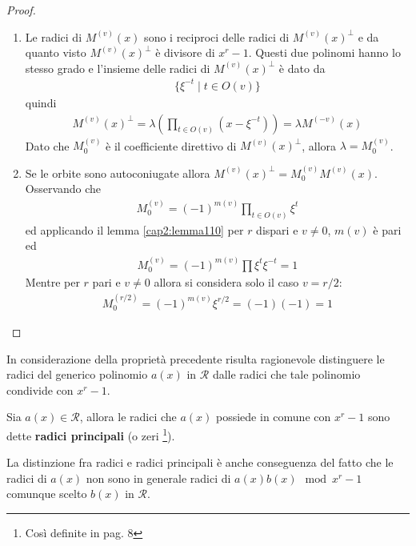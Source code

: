 \begin{proof}
\begin{enumerate}
      \item Le radici di $M^{(v)}(x)$ sono i reciproci delle radici di $M^{(v)}(x)^{\perp}$ e da quanto visto $M^{(v)}(x)^{\perp}$ è divisore di $x^r - 1$. Questi due polinomi hanno lo stesso grado e l'insieme delle radici di $M^{(v)}(x)^{\perp}$ è dato da
      \begin{align*}
	 \lbrace \xi^{-t} \mid t \in O(v) \rbrace
       \end{align*}
      quindi
      \begin{align*}
	 M^{(v)}(x)^{\perp} = \lambda (\prod_{t \in O(v)}(x-\xi^{-t}) ) = \lambda M^{(-v)}(x)
       \end{align*}
      Dato che $M_{0}^{(v)}$ è il coefficiente direttivo di $M^{(v)}(x)^{\perp}$, allora $\lambda = M_{0}^{(v)}$.
      \item Se le orbite sono autoconiugate allora $M^{(v)}(x)^{\perp} = M_{0}^{(v)} M^{(v)}(x)$. Osservando che
      \begin{align*}
	 M_{0}^{(v)}  = (-1)^{m(v)} \prod_{t \in O(v)}\xi^{t}
       \end{align*}
       ed applicando il lemma \ref{cap2:lemma110} per $r$ dispari e $v\neq 0$, $m(v)$ è pari ed
       \begin{align*}
	 M_{0}^{(v)}  = (-1)^{m(v)} \prod \xi^{t} \xi^{-t} = 1
       \end{align*}
       Mentre per $r$ pari e $v\neq 0$ allora si considera solo il caso $v=r/2$:
       \begin{align*}
	 M_{0}^{(r/2)}  = (-1)^{m(v)}  \xi^{r/2}  = (-1)(-1) = 1
       \end{align*}
   \end{enumerate}
\end{proof}
\noindent
In considerazione della proprietà precedente risulta ragionevole distinguere le radici del generico polinomio $a(x)$ in $\mathcal{R}$ dalle radici che tale polinomio condivide con $x^r - 1$.
\begin{definizione}
   Sia $a(x) \in \mathcal{R}$, allora le radici che $a(x)$ possiede in comune con $x^r - 1$ sono dette {\bf radici principali} (o zeri \footnote{Così definite in \cite{cerruti} pag. 8}).
\end{definizione}
\noindent
La distinzione fra radici e radici principali è anche conseguenza del fatto che le radici di $a(x)$ non sono in generale radici di $a(x)b(x) \mod{x^r-1}$ comunque scelto $b(x)$ in $\mathcal{R}$.

